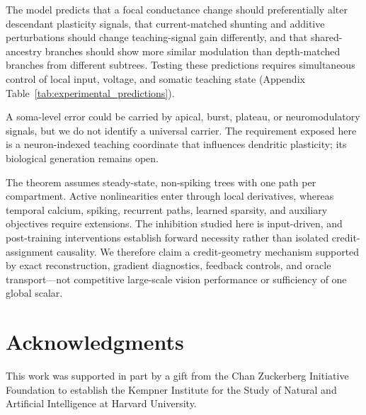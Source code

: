     The model predicts that a focal conductance change should preferentially alter descendant plasticity signals, that current-matched shunting and additive perturbations should change teaching-signal gain differently, and that shared-ancestry branches should show more similar modulation than depth-matched branches from different subtrees. Testing these predictions requires simultaneous control of local input, voltage, and somatic teaching state (Appendix Table~\ref{tab:experimental_predictions}).

    A soma-level error could be carried by apical, burst, plateau, or neuromodulatory signals, but we do not identify a universal carrier. The requirement exposed here is a neuron-indexed teaching coordinate that influences dendritic plasticity; its biological generation remains open.

    The theorem assumes steady-state, non-spiking trees with one path per compartment. Active nonlinearities enter through local derivatives, whereas temporal calcium, spiking, recurrent paths, learned sparsity, and auxiliary objectives require extensions. The inhibition studied here is input-driven, and post-training interventions establish forward necessity rather than isolated credit-assignment causality. We therefore claim a credit-geometry mechanism supported by exact reconstruction, gradient diagnostics, feedback controls, and oracle transport---not competitive large-scale vision performance or sufficiency of one global scalar.

    \ifdefined\localcaauthorversion
    \section*{Acknowledgments}
    This work was supported in part by a gift from the Chan Zuckerberg Initiative Foundation to establish the Kempner Institute for the Study of Natural and Artificial Intelligence at Harvard University.
    \fi
    
    
